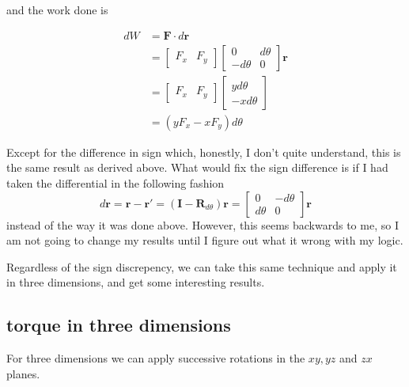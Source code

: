 \documentclass{article}      %
\newcommand{\Br}[0]{\mathbf{r}}
\newcommand{\BF}[0]{\mathbf{F}}
\newcommand{\BI}[0]{\mathbf{I}}
\newcommand{\BR}[0]{\mathbf{R}}
\begin{document}
and the work done is

\begin{align*}
dW &= \BF \cdot d\Br \\
   &=
\begin{bmatrix}
F_x & F_y
\end{bmatrix}
\begin{bmatrix}
 0 & d\theta \\
-d\theta & 0
\end{bmatrix}
\Br \\
   &=
\begin{bmatrix}
F_x & F_y
\end{bmatrix}
\begin{bmatrix}
 y d\theta \\
-x d\theta
\end{bmatrix} \\
   &=
(y F_x - x F_y) d\theta
\end{align*}

Except for the difference in sign which, honestly, I don't quite understand, this is the same result
as derived above.
What would fix the sign difference is if I had taken the differential in the following fashion
\begin{equation*}
d\Br = \Br - \Br' =
(\BI - \BR_{d\theta}) \Br
=
\begin{bmatrix}
 0 & -d\theta \\
d\theta & 0
\end{bmatrix}
\Br
\end{equation*}
instead of the way it was done above.  However, this seems backwards to me, so I am not going to
change my results until I figure out what it wrong with my logic.

Regardless of the sign discrepency, we can take this same technique and apply it in three dimensions, and
get some interesting results.

\subsection{torque in three dimensions}
For three dimensions we can apply successive rotations in the $xy, yz$ and $zx$ planes.
\end{document}
